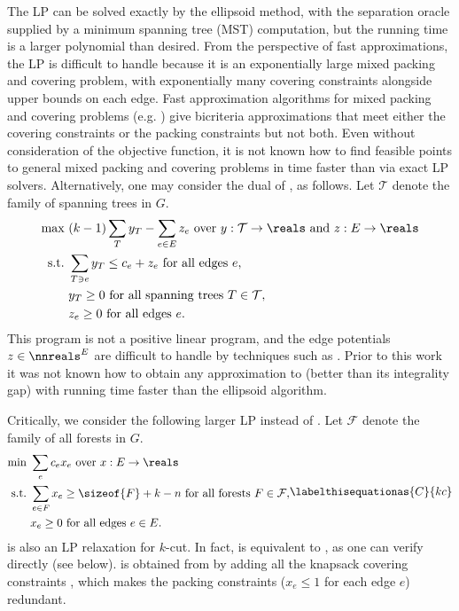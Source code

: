 \documentclass[11pt]{article}
\numberwithin{equation}{section}
\theoremstyle{definition}
\theoremstyle{plain}
\newcommand{\costof}[1]{c_{#1}}
\newcommand{\capacityof}{\costof}%
\providecommand{\trees}{\mathcal{T}} %
\newcommand{\forests}{\mathcal{F}} %
\begin{document}
The LP  can be solved exactly by the ellipsoid method,
with the separation oracle supplied by a minimum spanning tree
%
(MST)   %
computation, but the running time is a larger polynomial than
desired. From the perspective of fast approximations, the LP
 is difficult to handle because it is an exponentially
large mixed packing and covering problem, with exponentially many
covering constraints alongside upper bounds on each edge. Fast
approximation algorithms for mixed packing and covering problems (e.g.
\cite{cq-18-soda,young-14}) give bicriteria approximations that
meet either the covering constraints or the packing constraints but
not both.  Even without consideration of the objective function, it is
not known how to find feasible points to general mixed packing and
covering problems in time faster than via exact LP
solvers. Alternatively, one may consider the dual of ,
as follows. Let $\trees$ denote the family of spanning trees in $G$.
\begin{align*}
  \text{max } %
  & (k-1)\sum_{T} y_T - \sum_{e \in E} z_e
    \text{ over } y: \trees \to \reals \text{ and } z: E \to \reals
  \\
  \text{s.t.\ }                 %
  & \sum_{T \ni e} y_T \leq \capacityof{e} + z_e \text{ for all edges }
    e, \\
  & y_T \geq 0 \text{ for all spanning trees } T \in \trees, %
  \\
  & z_e \geq 0 \text{ for all edges } e.
\end{align*}
This program is not a positive linear program, and the edge potentials
$z \in \nnreals^E$ are difficult to handle by techniques such as
\cite{young-14,cq-17-soda,cq-18-soda}. %
%
%
%
%
Prior to this work it was not known  %
how to obtain any approximation to  (better
than its integrality gap) with running time faster than the 
ellipsoid algorithm.

Critically, we consider the following larger LP instead of
. Let $\forests$ denote the family of all forests in
$G$.
\begin{align}
  \begin{aligned}
    \text{min } %
    & \sum_{e} \costof{e} x_e %
    \text{ over } %
    x: E \to \reals \\
    \text{s.t.\ } & \sum_{e \in F} x_e \geq \sizeof{F} + k - n \text{
      for all forests } F \in \forests,
    \\
    & %
    x_e \geq 0 \text{ for all edges } e \in E.
  \end{aligned}
      \labelthisequationas{C}{kc}
\end{align}
 is also an LP relaxation for $k$-cut. In fact,
 is equivalent to , as one can verify
directly (see  below).  is obtained
from  by adding all the knapsack covering constraints
\cite{cflp-00}, which makes the packing constraints ($x_e \leq 1$ for
each edge $e$) redundant.
\end{document}
